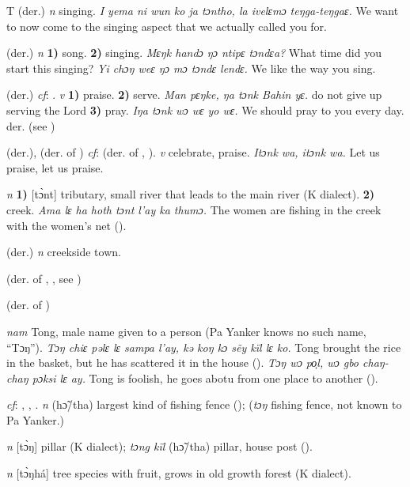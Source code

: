 \begin{letter}{T}
 (der.) \textit{n} singing. \textit{I yema ni wun ko ja tɔntho, la ivelɛmɔ teŋga-teŋgaɛ.} We want to now come to the singing aspect that we actually called you for.

 (der.) \textit{n} \textbf{1)} song. \textbf{2)} singing. \textit{Mɛŋk handɔ ŋɔ ntipɛ tɔndɛa?} What time did you start this singing? \textit{Yi chɔŋ weɛ ŋɔ mɔ tɔndɛ lendɛ.} We like the way you sing.

 (der.) \textit{cf}: . \textit{v} \textbf{1)} praise. \textbf{2)} serve. \textit{Man pɛŋke, ŋa tɔnk Bahin yɛ.} do not give up serving the Lord \textbf{3)} pray. \textit{Iŋa tɔnk wɔ wɛ yo wɛ.} We should pray to you every day. der.  (see )

 (der.), (der. of ) \textit{cf}:  (der. of , ). \textit{v} celebrate, praise. \textit{Itɔnk wa, itɔnk wa.} Let us praise, let us praise.

 \textit{n} \textbf{1)} [tɔ̀nt] tributary, small river that leads to the main river (K dialect). \textbf{2)} creek. \textit{Ama lɛ ha hoth tɔnt l'ay ka thumɔ.} The women are fishing in the creek with the women's net (\citealt{Pichl1967}). 

 (der.) \textit{n} creekside town.

 (der. of , , see ) 

 (der. of ) 

 \textit{nam} Tong, male name given to a person (Pa Yanker knows no such name, “Tɔŋ”). \textit{Tɔŋ chiɛ pəlɛ lɛ sampa l'ay, kə koŋ kɔ sẽy kïl lɛ ko.} Tong brought the rice in the basket, but he has scattered it in the house (\citealt{Pichl1967}). \textit{Tɔŋ wɔ po̹l, wɔ gbo chaŋ-chaŋ pɔksi lɛ ay.} Tong is foolish, he goes abotu from one place to another (\citealt{Pichl1967}).

 \textit{cf}: , , . \textit{n} (hɔ̃/tha) largest kind of fishing fence (\citealt{Pichl1967}); (\textit{tɔŋ} fishing fence, not known to Pa Yanker.)

 \textit{n} [tɔ̀ŋ] pillar (K dialect); \textit{tɔng kïl} (hɔ̃/tha) pillar, house post (\citealt{Pichl1967}).

 \textit{n} [tɔ̀ŋhá] tree species with fruit, grows in old growth forest (K dialect). 


\end{letter}
